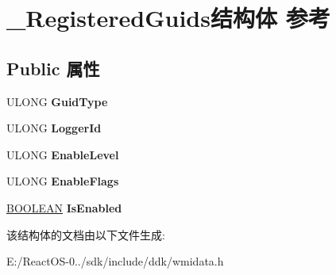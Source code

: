 \hypertarget{struct___registered_guids}{}\section{\+\_\+\+Registered\+Guids结构体 参考}
\label{struct___registered_guids}
\subsection*{Public 属性}
\begin{DoxyCompactItemize}
\item 
\mbox{\label{struct___registered_guids_a37ba86ce85c6f720becddcfeb14f095d}} 
U\+L\+O\+NG {\bfseries Guid\+Type}
\item 
\mbox{\label{struct___registered_guids_a25cd6185ebd7895c7dd8a15b34fc57fe}} 
U\+L\+O\+NG {\bfseries Logger\+Id}
\item 
\mbox{\label{struct___registered_guids_afe87b8298241f00cefdf583cc1e013e4}} 
U\+L\+O\+NG {\bfseries Enable\+Level}
\item 
\mbox{\label{struct___registered_guids_a36d2324cbab9da814ec951127221c26e}} 
U\+L\+O\+NG {\bfseries Enable\+Flags}
\item 
\mbox{\label{struct___registered_guids_a9b9f9f23d47e554f2130bc34002cb498}} 
\hyperlink{_processor_bind_8h_a112e3146cb38b6ee95e64d85842e380a}{B\+O\+O\+L\+E\+AN} {\bfseries Is\+Enabled}
\end{DoxyCompactItemize}


该结构体的文档由以下文件生成\+:\begin{DoxyCompactItemize}
\item 
E\+:/\+React\+O\+S-\/0../sdk/include/ddk/wmidata.\+h\end{DoxyCompactItemize}

